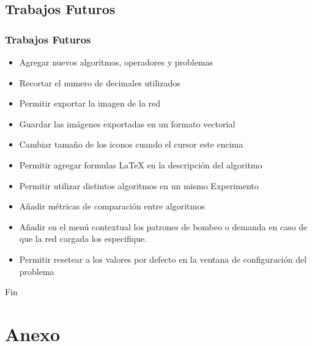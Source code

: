 \documentclass[9pt]{beamer}
\begin{document}
    \subsection{Trabajos Futuros}
    \begin{frame}
        \frametitle{Trabajos Futuros}                       
           
        \begin{itemize}
            \item Agregar nuevos algoritmos, operadores y problemas
            \item Recortar el numero de decimales utilizados
            \item Permitir exportar la imagen de la red
            \item Guardar las imágenes exportadas en un formato vectorial
            \item Cambiar tamaño de los iconos cuando el cursor este encima
            \item Permitir agregar formulas LaTeX en la descripción del algoritmo
            \item Permitir utilizar distintos algoritmos en un mismo Experimento
            \item Añadir métricas de comparación entre algoritmos
            \item Añadir en el menú contextual los patrones de bombeo o demanda en caso de que la red cargada los especifique.
            \item Permitir resetear a los valores por defecto  en la ventana de configuración del problema
        \end{itemize}

    
    \end{frame}

    \begin{frame}    
        \centering       
        \Huge{Fin}
    \end{frame}

    \section{Anexo}
\end{document}
